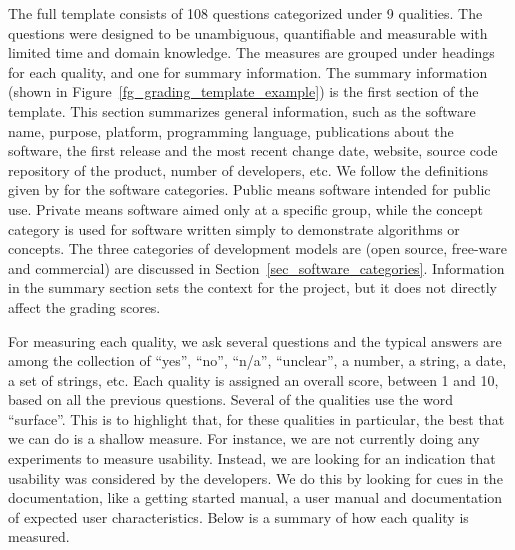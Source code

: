 \documentclass[final, 3p, times, authoryear]{elsarticle}
\begin{document}
The full template consists of 108 questions categorized under 9 qualities.  The
questions were designed to be unambiguous, quantifiable and measurable with
limited time and domain knowledge. The measures are grouped under headings for
each quality, and one for summary information. The summary information (shown in
Figure~\ref{fg_grading_template_example}) is the first section of the template.
This section summarizes general information, such as the software name, purpose,
platform, programming language, publications about the software, the first
release and the most recent change date, website, source code repository of the
product, number of developers, etc.  We follow the definitions given by
\citet{GewaltigAndCannon2012} for the software categories.  Public means
software intended for public use.  Private means software aimed only at a
specific group, while the concept category is used for software written simply
to demonstrate algorithms or concepts. The three categories of development
models are (open source, free-ware and commercial) are discussed in
Section~\ref{sec_software_categories}.  Information in the summary section sets
the context for the project, but it does not directly affect the grading scores.

For measuring each quality, we ask several questions and the typical answers are
among the collection of ``yes'', ``no'', ``n/a'', ``unclear'', a number, a
string, a date, a set of strings, etc. Each quality is assigned an overall
score, between 1 and 10, based on all the previous questions.  Several of the
qualities use the word ``surface''.  This is to highlight that, for these
qualities in particular, the best that we can do is a shallow measure.  For
instance, we are not currently doing any experiments to measure usability.
Instead, we are looking for an indication that usability was considered by the
developers.  We do this by looking for cues in the documentation, like a getting
started manual, a user manual and documentation of expected user
characteristics.  Below is a summary of how each quality is measured.
\end{document}
